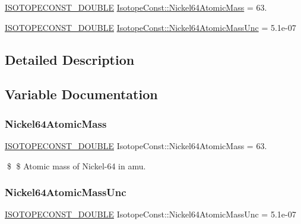 \begin{DoxyCompactItemize}
\item 
\mbox{\hyperlink{group___isotope_const-_macros_ga8f45a7272ce02c0b4c65c44636ed719a}{I\+S\+O\+T\+O\+P\+E\+C\+O\+N\+S\+T\+\_\+\+D\+O\+U\+B\+LE}} \mbox{\hyperlink{group___isotope_const-_nickel-_ni64_ga7fe903cc7438f09d51e3f6a40f0ebdae}{Isotope\+Const\+::\+Nickel64\+Atomic\+Mass}} = 63.
\item 
\mbox{\hyperlink{group___isotope_const-_macros_ga8f45a7272ce02c0b4c65c44636ed719a}{I\+S\+O\+T\+O\+P\+E\+C\+O\+N\+S\+T\+\_\+\+D\+O\+U\+B\+LE}} \mbox{\hyperlink{group___isotope_const-_nickel-_ni64_ga718fe4183a401ac5948230a96a1f0f15}{Isotope\+Const\+::\+Nickel64\+Atomic\+Mass\+Unc}} = 5.\+1e-\/07
\end{DoxyCompactItemize}


\subsection{Detailed Description}


\subsection{Variable Documentation}
\mbox{\label{group___isotope_const-_nickel-_ni64_ga7fe903cc7438f09d51e3f6a40f0ebdae}} 
\subsubsection{\texorpdfstring{Nickel64\+Atomic\+Mass}{Nickel64AtomicMass}}
{\footnotesize\ttfamily \mbox{\hyperlink{group___isotope_const-_macros_ga8f45a7272ce02c0b4c65c44636ed719a}{I\+S\+O\+T\+O\+P\+E\+C\+O\+N\+S\+T\+\_\+\+D\+O\+U\+B\+LE}} Isotope\+Const\+::\+Nickel64\+Atomic\+Mass = 63.}

\$ \$ Atomic mass of Nickel-\/64 in amu. \mbox{\label{group___isotope_const-_nickel-_ni64_ga718fe4183a401ac5948230a96a1f0f15}} 
\subsubsection{\texorpdfstring{Nickel64\+Atomic\+Mass\+Unc}{Nickel64AtomicMassUnc}}
{\footnotesize\ttfamily \mbox{\hyperlink{group___isotope_const-_macros_ga8f45a7272ce02c0b4c65c44636ed719a}{I\+S\+O\+T\+O\+P\+E\+C\+O\+N\+S\+T\+\_\+\+D\+O\+U\+B\+LE}} Isotope\+Const\+::\+Nickel64\+Atomic\+Mass\+Unc = 5.\+1e-\/07}

